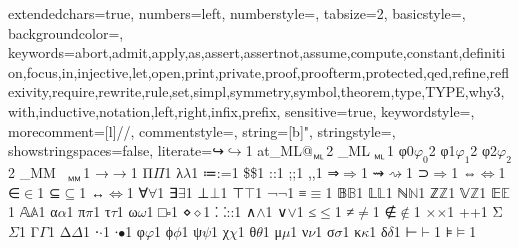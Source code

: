 {
	extendedchars=true,
	numbers=left,
	numberstyle={},
	tabsize=2,
	basicstyle={\footnotesize\sffamily\upshape}, %
	backgroundcolor=\color{white},
	keywords={abort,admit,apply,as,assert,assertnot,assume,compute,constant,definition,focus,in,injective,let,open,print,private,proof,proofterm,protected,qed,refine,reflexivity,require,rewrite,rule,set,simpl,symmetry,symbol,theorem,type,TYPE,why3,with,inductive,notation,left,right,infix,prefix},
	sensitive=true,
	keywordstyle=\color{blue},
	morecomment=[l]{//},
	commentstyle={\itshape\color{red}},
	string=[b]{"},
	stringstyle=\color{green},
	showstringspaces=false,
	literate={↪}{{{\color{blue}$\hookrightarrow$}}}1
	{at_ML}{{@${\mkern 0mu}_{{}_\mathsf{ML}}$}}2
	{_ML}{{${\mkern 5mu}_{{}_\mathsf{ML}}$}}1
	{φ0}{$\varphi_{0}$}2
	{φ1}{$\varphi_{1}$}2
	{φ2}{$\varphi_{2}$}2
	{_MM}{{${\mkern 15mu}_{{}_\mathsf{MM}}$}}1
	{→}{{{\color{blue}$\rightarrow$}}}1
	{Π}{{{\color{blue}$\Pi$}}}1
	{λ}{{{\color{blue}$\lambda$}}}1
	{≔}{{{\color{blue}:=}}}1
	{\$}{{{\color{blue}\$}}}1
	{:}{{{\color{blue}:}}}1
	{;}{{{\color{blue};}}}1
	{,}{{{\color{blue},}}}1
	{⇒}{$\Rightarrow$}1
	{⇝}{$\rightsquigarrow$}1
	{⊃}{$\Rightarrow$}1  %
	{⇔}{$\Leftrightarrow$}1
	{∈}{$\in$}1
	{⊆}{$\subseteq$}1
	{↔}{$\Leftrightarrow$}1
	{∀}{$\forall$}1
	{∃}{$\exists$}1
	{⊥}{$\bot$}1
	{⊤}{$\top$}1
	{¬}{$\neg$}1
	{≡}{$\equiv$}1
        {𝔹}{$\mathbb{B}$}1 {𝕃}{$\mathbb{L}$}1
	{ℕ}{$\mathbb{N}$}1 {ℤ}{$\mathbb{Z}$}1 {𝕍}{$\mathbb{Z}$}1
	{𝔼}{$\mathbb{E}$}1 {𝔸}{$\mathbb{A}$}1
	{α}{$\alpha$}1 {π}{$\pi$}1 {τ}{$\tau$}1 {ω}{$\omega$}1
	{□}{$\square$}1
	{⋄}{$\diamond$}1
	{⸬}{::}1
	{∧}{$\wedge$}1 {∨}{$\lor$}1
	{≤}{$\le$}1 {≠}{$\neq$}1 {∉}{$\notin$}1
	{×}{$\times$}1 {+}{+}1
	{Σ}{$\Sigma$}1
	{Γ}{$\Gamma$}1
	{Δ}{$\Delta$}1
	{⋅}{$\cdot$}1
	{∙}{$\bullet$}1
	{φ}{$\varphi$}1
	{ϕ}{$\phi$}1
	{ψ}{$\psi$}1
	{χ}{$\chi$}1
	{θ}{$\theta$}1
	{μ}{$\mu$}1
	{ν}{$\nu$}1
	{σ}{$\sigma$}1
	{κ}{$\kappa$}1
	{δ}{$\delta$}1
	{⊢}{$\vdash$}1
	{⊧}{$\models$}1
}
